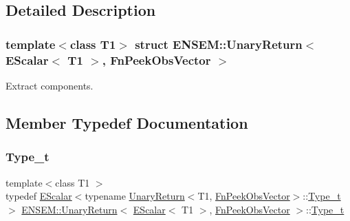 \subsection{Detailed Description}
\subsubsection*{template$<$class T1$>$\newline
struct E\+N\+S\+E\+M\+::\+Unary\+Return$<$ E\+Scalar$<$ T1 $>$, Fn\+Peek\+Obs\+Vector $>$}

Extract components. 

\subsection{Member Typedef Documentation}
\mbox{\label{structENSEM_1_1UnaryReturn_3_01EScalar_3_01T1_01_4_00_01FnPeekObsVector_01_4_ab344f63bc162dc2012f97d027b589de9}} 
\subsubsection{\texorpdfstring{Type\_t}{Type\_t}\hspace{0.1cm}{\footnotesize\ttfamily [1/3]}}
{\footnotesize\ttfamily template$<$class T1 $>$ \\
typedef \mbox{\hyperlink{classENSEM_1_1EScalar}{E\+Scalar}}$<$typename \mbox{\hyperlink{structENSEM_1_1UnaryReturn}{Unary\+Return}}$<$T1, \mbox{\hyperlink{structENSEM_1_1FnPeekObsVector}{Fn\+Peek\+Obs\+Vector}}$>$\+::\mbox{\hyperlink{structENSEM_1_1UnaryReturn_3_01EScalar_3_01T1_01_4_00_01FnPeekObsVector_01_4_ab344f63bc162dc2012f97d027b589de9}{Type\+\_\+t}}$>$ \mbox{\hyperlink{structENSEM_1_1UnaryReturn}{E\+N\+S\+E\+M\+::\+Unary\+Return}}$<$ \mbox{\hyperlink{classENSEM_1_1EScalar}{E\+Scalar}}$<$ T1 $>$, \mbox{\hyperlink{structENSEM_1_1FnPeekObsVector}{Fn\+Peek\+Obs\+Vector}} $>$\+::\mbox{\hyperlink{structENSEM_1_1UnaryReturn_3_01EScalar_3_01T1_01_4_00_01FnPeekObsVector_01_4_ab344f63bc162dc2012f97d027b589de9}{Type\+\_\+t}}}

\mbox{\label{structENSEM_1_1UnaryReturn_3_01EScalar_3_01T1_01_4_00_01FnPeekObsVector_01_4_ab344f63bc162dc2012f97d027b589de9}} 
